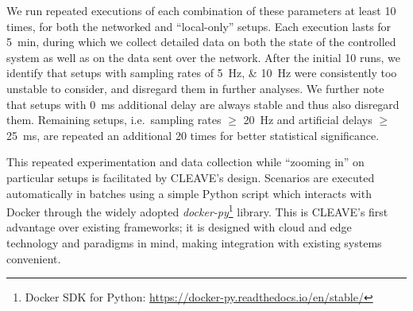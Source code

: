 We run repeated executions of each combination of these parameters at least \num{10} times, for both the networked and ``local-only'' setups.
Each execution lasts for \SI{5}{\minute}, during which we collect detailed data on both the state of the controlled system as well as on the data sent over the network.
After the initial \num{10} runs, we identify that setups with sampling rates of \SIlist{5;10}{\hertz} were consistently too unstable to consider, and disregard them in further analyses.
We further note that setups with \SI{0}{\milli\second} additional delay are always stable and thus also disregard them.
Remaining setups, i.e.\ sampling rates \( \geq \) \SI{20}{\hertz} and artificial delays \( \geq \) \SI{25}{\milli\second}, are repeated an additional \num{20} times for better statistical significance.

This repeated experimentation and data collection while ``zooming in'' on particular setups is facilitated by \gls{CLEAVE}'s design.
Scenarios are executed automatically in batches using a simple Python script which interacts with Docker through the widely adopted \emph{docker-py}\footnote{Docker SDK for Python: \url{https://docker-py.readthedocs.io/en/stable/}} library.
This is \gls{CLEAVE}'s first advantage over existing frameworks;
it is designed with cloud and edge technology and paradigms in mind, making integration with existing systems convenient.

